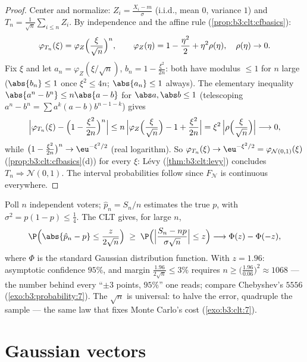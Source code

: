 \begin{proof}
Center and normalize: $Z_i = \frac{X_i - m}{\sigma}$
(i.i.d., mean $0$, variance $1$) and $T_n =
\frac1{\sqrt n}\sum_{i\leq n}Z_i$. By independence and the
affine rule (\cref{prop:b3:clt:cfbasics}):
\[
\varphi_{T_n}(\xi) =
\varphi_{Z}\Bigl(\frac{\xi}{\sqrt n}\Bigr)^{n},
\qquad
\varphi_Z(\eta) = 1 - \frac{\eta^2}2 + \eta^2\rho(\eta),\quad
\rho(\eta)\to0 .
\]
Fix $\xi$ and let $a_n = \varphi_Z(\xi/\sqrt n)$, $b_n = 1 -
\frac{\xi^2}{2n}$: both have modulus $\leq 1$ for $n$ large
($\abs{b_n} \leq 1$ once $\xi^2 \leq 4n$; $\abs{a_n} \leq 1$
always). The elementary inequality $\abs{a^n - b^n} \leq
n\abs{a - b}$ for $\abs a, \abs b \leq 1$ (telescoping
$a^n - b^n = \sum a^k(a - b)b^{n-1-k}$) gives
\[
\Bigl|\varphi_{T_n}(\xi) - \Bigl(1 -
\frac{\xi^2}{2n}\Bigr)^{n}\Bigr|
\leq n\,\Bigl|\varphi_Z\Bigl(\frac\xi{\sqrt n}\Bigr) - 1 +
\frac{\xi^2}{2n}\Bigr|
= \xi^2\,\Bigl|\rho\Bigl(\frac{\xi}{\sqrt n}\Bigr)\Bigr|
\longrightarrow 0,
\]
while $\bigl(1 - \frac{\xi^2}{2n}\bigr)^n \to
\eu^{-\xi^2/2}$ (real logarithm). So $\varphi_{T_n}(\xi) \to
\eu^{-\xi^2/2} = \varphi_{\mathcal N(0,1)}(\xi)$
(\cref{prop:b3:clt:cfbasics}(d)) for every $\xi$: L\'evy
(\cref{thm:b3:clt:levy}) concludes $T_n \Rightarrow \mathcal
N(0,1)$. The interval probabilities follow since $F_{\mathcal
N}$ is continuous everywhere.
\end{proof}

\begin{example}
\label{ex:b3:clt:confidence}
Poll $n$ independent voters; $\hat p_n = S_n/n$ estimates the
true $p$, with $\sigma^2 = p(1-p) \leq \frac14$. The CLT
gives, for large $n$,
\[
\P\Bigl(\abs{\hat p_n - p} \leq
\frac{z}{2\sqrt n}\Bigr)
\;\geq\; \P\Bigl(\Bigl|\frac{S_n - np}{\sigma\sqrt n}\Bigr|
\leq z\Bigr)
\longrightarrow \Phi(z) - \Phi(-z),
\]
where $\Phi$ is the standard Gaussian distribution function.
With $z = 1.96$: asymptotic confidence $95\%$, and margin
$\frac{1.96}{2\sqrt n} \leq 3\%$ requires $n \geq
\bigl(\frac{1.96}{0.06}\bigr)^2 \approx 1068$ --- the number
behind every ``$\pm3$ points, $95\%$'' one reads; compare
Chebyshev's $5556$ (\cref{exo:b3:probability:7}). The
$\sqrt n$ is universal: to halve the error, quadruple the
sample --- the same law that fixes Monte Carlo's cost
(\cref{exo:b3:clt:7}).
\end{example}

\section{Gaussian vectors}

